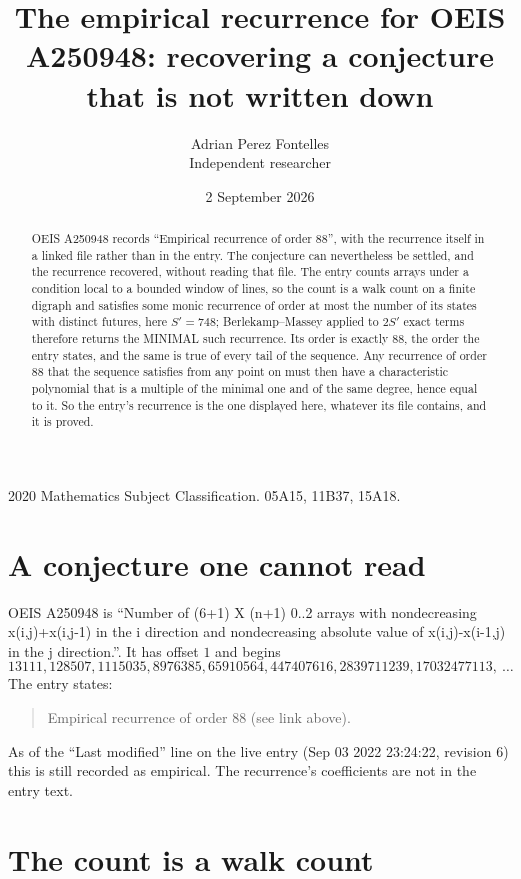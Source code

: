 \documentclass[11pt,a4paper]{article}
\title{The empirical recurrence for OEIS A250948: recovering a conjecture that is not written down}
\author{Adrian Perez Fontelles\\ \small Independent researcher}
\date{2 September 2026}
\theoremstyle{plain}
\theoremstyle{definition}
\begin{document}
\maketitle

\begin{abstract}
OEIS A250948 records ``Empirical recurrence of order $88$'', with the recurrence itself in a
linked file rather than in the entry. The conjecture can nevertheless be settled, and the
recurrence recovered, without reading that file. The entry counts arrays under a condition
local to a bounded window of lines, so the count is a walk count on a finite digraph and
satisfies some monic recurrence of order at most the number of its states with distinct
futures, here $S'=748$; Berlekamp--Massey applied to $2S'$ exact
terms therefore returns the MINIMAL such recurrence. Its order is exactly $88$, the order
the entry states, and the same is true of every tail of the sequence. Any recurrence of order
$88$ that the sequence satisfies from any point on must then have a characteristic
polynomial that is a multiple of the minimal one and of the same degree, hence equal to it. So
the entry's recurrence is the one displayed here, whatever its file contains, and it is
proved.
\end{abstract}

\noindent\small 2020 Mathematics Subject Classification. 05A15, 11B37, 15A18.\normalsize

\section{A conjecture one cannot read}

OEIS A250948 is ``Number of (6+1) X (n+1) 0..2 arrays with nondecreasing x(i,j)+x(i,j-1) in the i direction and nondecreasing absolute value of x(i,j)-x(i-1,j) in the j direction.''. It has offset $1$ and begins
\[
13111, 128507, 1115035, 8976385, 65910564, 447407616, 2839711239, 17032477113,\ \dots
\]
The entry states:
\begin{quote}
Empirical recurrence of order 88 (see link above).
\end{quote}
As of the ``Last modified'' line on the live entry (Sep 03 2022 23:24:22, revision 6) this is still
recorded as empirical. The recurrence's coefficients are not in the entry text.

\section{The count is a walk count}
\end{document}
